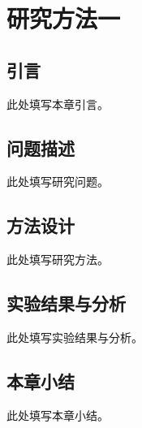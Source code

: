 \chapter{研究方法一}
\label{chap:method-one}
\section{引言}
此处填写本章引言。
\section{问题描述}
此处填写研究问题。
\section{方法设计}
此处填写研究方法。
\section{实验结果与分析}
此处填写实验结果与分析。
\section{本章小结}
此处填写本章小结。
